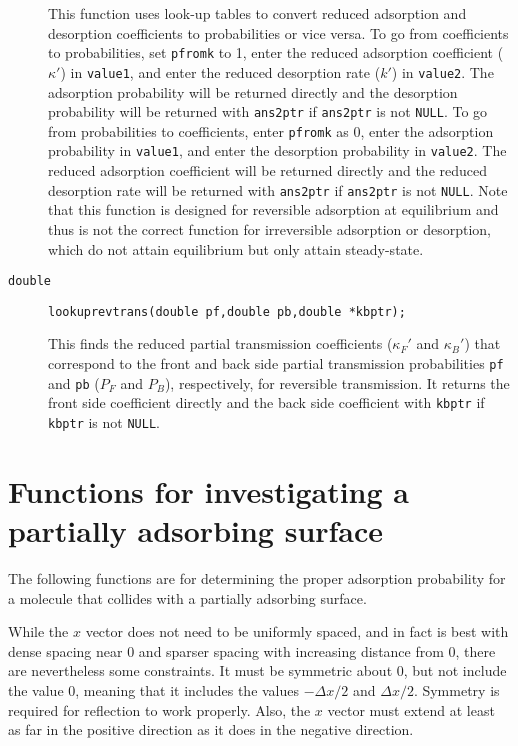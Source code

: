 \documentclass[11pt]{article}
\newcommand {\ttt} {\texttt}
\begin{document}
\begin{description}
This function uses look-up tables to convert reduced adsorption and desorption coefficients to probabilities or vice versa. To go from coefficients to probabilities, set \ttt{pfromk} to 1, enter the reduced adsorption coefficient ($\kappa'$) in \ttt{value1}, and enter the reduced desorption rate ($k'$) in \ttt{value2}. The adsorption probability will be returned directly and the desorption probability will be returned with \ttt{ans2ptr} if \ttt{ans2ptr} is not \ttt{NULL}. To go from probabilities to coefficients, enter \ttt{pfromk} as 0, enter the adsorption probability in \ttt{value1}, and enter the desorption probability in \ttt{value2}. The reduced adsorption coefficient will be returned directly and the reduced desorption rate will be returned with \ttt{ans2ptr} if \ttt{ans2ptr} is not \ttt{NULL}. Note that this function is designed for reversible adsorption at equilibrium and thus is not the correct function for irreversible adsorption or desorption, which do not attain equilibrium but only attain steady-state.


\item[\ttt{double}]
\ttt{lookuprevtrans(double pf,double pb,double *kbptr);}

This finds the reduced partial transmission coefficients ($\kappa_F'$ and $\kappa_B'$) that correspond to the front and back side partial transmission probabilities \ttt{pf} and \ttt{pb} ($P_F$ and $P_B$), respectively, for reversible transmission. It returns the front side coefficient directly and the back side coefficient with \ttt{kbptr} if \ttt{kbptr} is not \ttt{NULL}.

\end{description}

\section{Functions for investigating a partially adsorbing surface}

The following functions are for determining the proper adsorption probability for a molecule that collides with a partially adsorbing surface.

While the $x$ vector does not need to be uniformly spaced, and in fact is best with dense spacing near 0 and sparser spacing with increasing distance from 0, there are nevertheless some constraints. It must be symmetric about 0, but not include the value 0, meaning that it includes the values $-\Delta x/2$ and $\Delta x/2$. Symmetry is required for reflection to work properly. Also, the $x$ vector must extend at least as far in the positive direction as it does in the negative direction.
\end{document}
